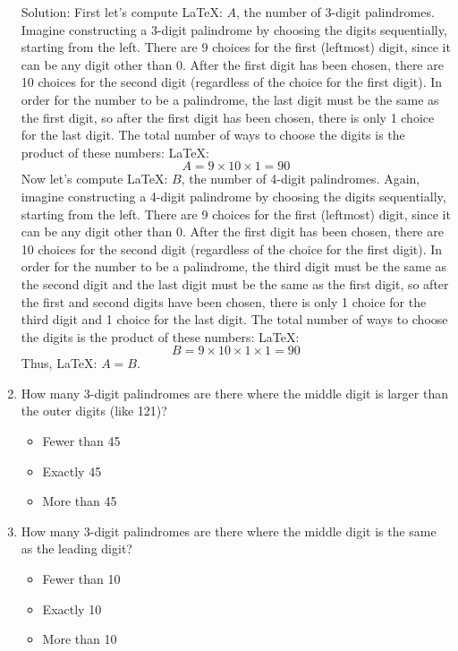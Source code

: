 \documentclass{article}
\begin{document}
\begin{enumerate}
    Solution:
    First let's compute LaTeX: \(A\), the number of 3-digit palindromes. Imagine constructing a 3-digit palindrome by choosing the digits sequentially, starting from the left. There are 9 choices for the first (leftmost) digit, since it can be any digit other than 0. After the first digit has been chosen, there are 10 choices for the second digit (regardless of the choice for the first digit). In order for the number to be a palindrome, the last digit must be the same as the first digit, so after the first digit has been chosen, there is only 1 choice for the last digit. The total number of ways to choose the digits is the product of these numbers:
    LaTeX: \[A = 9 \times 10 \times 1 = 90\]
    Now let's compute LaTeX: \(B\), the number of 4-digit palindromes. Again, imagine constructing a 4-digit palindrome by choosing the digits sequentially, starting from the left. There are 9 choices for the first (leftmost) digit, since it can be any digit other than 0. After the first digit has been chosen, there are 10 choices for the second digit (regardless of the choice for the first digit). In order for the number to be a palindrome, the third digit must be the same as the second digit and the last digit must be the same as the first digit, so after the first and second digits have been chosen, there is only 1 choice for the third digit and 1 choice for the last digit. The total number of ways to choose the digits is the product of these numbers:
    LaTeX: \[B = 9 \times 10 \times 1 \times 1 = 90\]
    Thus, LaTeX: \(A = B\).
    
    \item How many 3-digit palindromes are there where the middle digit is larger than the outer digits (like 121)?
    
    \begin{itemize}
        \item Fewer than 45
        \item Exactly 45
        \item More than 45
    \end{itemize}
    
    \item How many 3-digit palindromes are there where the middle digit is the same as the leading digit?
    
    \begin{itemize}
        \item Fewer than 10
        \item Exactly 10
        \item More than 10
    \end{itemize}

\end{enumerate}
\end{document}
